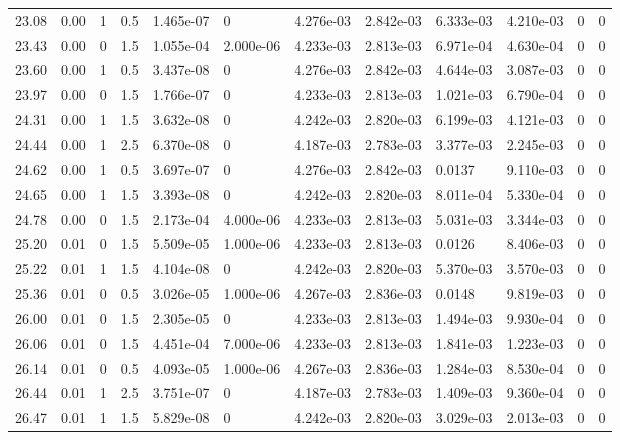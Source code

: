 \documentclass[preview]{standalone}
\begin{document}
{{{{\begin{tabular}{L{1.2cm}C{1.2cm} C{0.3cm}C{0.5cm} C{1.4cm}C{1.4cm} C{1.4cm}C{1.4cm} C{1.6cm}C{1.6cm} C{1.6cm}C{1.6cm}}
  23.08  &  0.00  & 1     & 0.5 &  1.465e-07  & 0  &  4.276e-03&   2.842e-03& 6.333e-03 & 4.210e-03   &  0 & 0  \\ 
  23.43  &  0.00  & 0     & 1.5 &  1.055e-04  & 2.000e-06  &  4.233e-03&   2.813e-03& 6.971e-04 & 4.630e-04   &  0 & 0  \\ 
  23.60  &  0.00  & 1     & 0.5 &  3.437e-08  & 0  &  4.276e-03&   2.842e-03& 4.644e-03 & 3.087e-03   &  0 & 0  \\ 
  23.97  &  0.00  & 0     & 1.5 &  1.766e-07  & 0  &  4.233e-03&   2.813e-03& 1.021e-03 & 6.790e-04   &  0 & 0  \\ 
  24.31  &  0.00  & 1     & 1.5 &  3.632e-08  & 0  &  4.242e-03&   2.820e-03& 6.199e-03 & 4.121e-03   &  0 & 0  \\ 
  24.44  &  0.00  & 1     & 2.5 &  6.370e-08  & 0  &  4.187e-03&   2.783e-03& 3.377e-03 & 2.245e-03   &  0 & 0  \\ 
  24.62  &  0.00  & 1     & 0.5 &  3.697e-07  & 0  &  4.276e-03&   2.842e-03& 0.0137 & 9.110e-03   &  0 & 0  \\ 
  24.65  &  0.00  & 1     & 1.5 &  3.393e-08  & 0  &  4.242e-03&   2.820e-03& 8.011e-04 & 5.330e-04   &  0 & 0  \\ 
  24.78  &  0.00  & 0     & 1.5 &  2.173e-04  & 4.000e-06  &  4.233e-03&   2.813e-03& 5.031e-03 & 3.344e-03   &  0 & 0  \\ 
  25.20  &  0.01  & 0     & 1.5 &  5.509e-05  & 1.000e-06  &  4.233e-03&   2.813e-03& 0.0126 & 8.406e-03   &  0 & 0  \\ 
  25.22  &  0.01  & 1     & 1.5 &  4.104e-08  & 0  &  4.242e-03&   2.820e-03& 5.370e-03 & 3.570e-03   &  0 & 0  \\ 
  25.36  &  0.01  & 0     & 0.5 &  3.026e-05  & 1.000e-06  &  4.267e-03&   2.836e-03& 0.0148 & 9.819e-03   &  0 & 0  \\ 
  26.00  &  0.01  & 0     & 1.5 &  2.305e-05  & 0  &  4.233e-03&   2.813e-03& 1.494e-03 & 9.930e-04   &  0 & 0  \\ 
  26.06  &  0.01  & 0     & 1.5 &  4.451e-04  & 7.000e-06  &  4.233e-03&   2.813e-03& 1.841e-03 & 1.223e-03   &  0 & 0  \\ 
  26.14  &  0.01  & 0     & 0.5 &  4.093e-05  & 1.000e-06  &  4.267e-03&   2.836e-03& 1.284e-03 & 8.530e-04   &  0 & 0  \\ 
  26.44  &  0.01  & 1     & 2.5 &  3.751e-07  & 0  &  4.187e-03&   2.783e-03& 1.409e-03 & 9.360e-04   &  0 & 0  \\ 
  26.47  &  0.01  & 1     & 1.5 &  5.829e-08  & 0  &  4.242e-03&   2.820e-03& 3.029e-03 & 2.013e-03   &  0 & 0  \\ 

\end{tabular}}}}}
\end{document}
